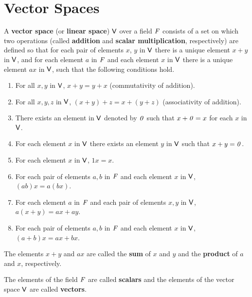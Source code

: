 \section{Vector Spaces}\label{sec:1.2}

\begin{defn}\label{1.2.1}
  A \textbf{vector space} (or \textbf{linear space}) \(\mathsf{V}\) over a field \(\mathit{F}\) consists of a set on which two operations (called \textbf{addition} and \textbf{scalar multiplication}, respectively) are defined so that for each pair of elements \(x\), \(y\) in \(\mathsf{V}\) there is a unique element \(x + y\) in \(\mathsf{V}\), and for each element \(a\) in \(\mathit{F}\) and each element \(x\) in \(\mathsf{V}\) there is a unique element \(ax\) in \(\mathsf{V}\), such that the following conditions hold.
  \begin{enumerate}[label=(VS \arabic*), ref=VS \arabic*]
    \item\label{vs1}
    For all \(x, y\) in \(\mathsf{V}\), \(x + y = y + x\)
    (commutativity of addition).
    \item\label{vs2}
    For all \(x, y, z\) in \(\mathsf{V}\), \((x + y) + z = x + (y + z)\)
    (associativity of addition).
    \item\label{vs3}
    There exists an element in \(\mathsf{V}\) denoted by \(\mathit{0}\) such that \(x + \mathit{0} = x\) for each \(x\) in \(\mathsf{V}\).
    \item\label{vs4}
    For each element \(x\) in \(\mathsf{V}\) there exists an element \(y\) in \(\mathsf{V}\) such that \(x + y = \mathit{0}\).
    \item\label{vs5}
    For each element \(x\) in \(\mathsf{V}\), \(1x = x\).
    \item\label{vs6}
    For each pair of elements \(a, b\) in \(\mathit{F}\) and each element \(x\) in \(\mathsf{V}\), \((ab) x = a (bx)\).
    \item\label{vs7}
    For each element \(a\) in \(\mathit{F}\) and each pair of elements \(x, y\) in \(\mathsf{V}\), \(a (x + y) = ax + ay\).
    \item\label{vs8}
    For each pair of elements \(a, b\) in \(\mathit{F}\) and each element \(x\) in \(\mathsf{V}\), \((a + b) x = ax + bx\).
  \end{enumerate}
  The elements \(x + y\) and \(ax\) are called the \textbf{sum} of \(x\) and \(y\) and the \textbf{product} of \(a\) and \(x\), respectively.
\end{defn}

\begin{defn}\label{1.2.2}
  The elements of the field \(\mathit{F}\) are called \textbf{scalars} and the elements of the vector space \(\mathsf{V}\) are called \textbf{vectors}.
\end{defn}

